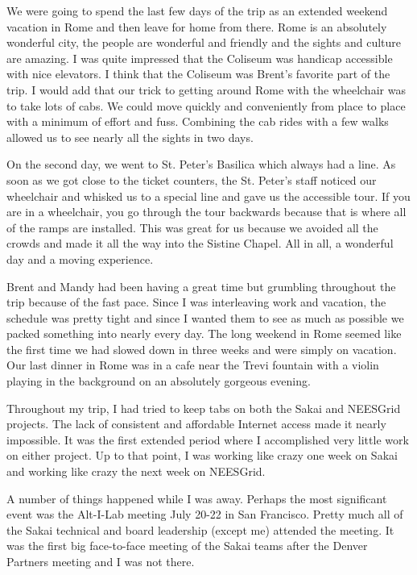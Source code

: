 \documentclass[12pt]{book}
\begin{document}
We were going to spend the last few days of
the trip as  an extended weekend vacation in Rome and
then leave for home from there.  Rome is an absolutely
wonderful city, the people
are wonderful and friendly and the sights and culture
are amazing.  I was quite impressed that the
Coliseum was handicap accessible with nice elevators.
I think that the Coliseum was Brent's favorite
part of the trip.  I would add that our trick to getting
around Rome with the wheelchair was to take lots of
cabs.  We could move quickly and conveniently from
place to place with a minimum of effort and fuss.
Combining the cab rides with a few walks allowed us
to see nearly all the sights in two days.

On the second day, we went to St. Peter's Basilica
which always had a line.  As soon as
we got close to the ticket counters, the St. Peter's
staff noticed our wheelchair and whisked us to
a special line and gave us the accessible tour.
If you are in a wheelchair, you go through
the tour backwards because that is where all of the
ramps are installed.  This was great for us because
we avoided all the crowds and made it all the way
into the Sistine Chapel.  All in all, a wonderful
day and a moving experience.

Brent and Mandy had been having a great time but
grumbling throughout the trip because of the fast
pace.  Since I was interleaving work
and vacation, the schedule was pretty tight and since
I wanted them to see as much as possible we packed
something into nearly every day.  The long weekend
in Rome seemed like the first time we had slowed
down in three weeks and were simply on vacation.
Our last dinner in Rome was in a cafe near the Trevi
fountain with a violin playing in the background
on an absolutely gorgeous evening.

Throughout my trip, I had tried to keep tabs on
both the Sakai and NEESGrid projects.  The lack
of consistent and affordable Internet access made
it nearly impossible.  It was the first extended
period where I accomplished very little work
on either project.  Up to that point, I was working
like crazy one week on Sakai and working like
crazy the next week on NEESGrid.

A number of things happened while I was away.  Perhaps
the most significant event was the Alt-I-Lab meeting
July 20-22 in San Francisco.  Pretty much all of the
Sakai technical and board leadership (except me) attended
the meeting.  It was the first big face-to-face
meeting of the Sakai teams after the Denver Partners
meeting and I was not there.
\end{document}
